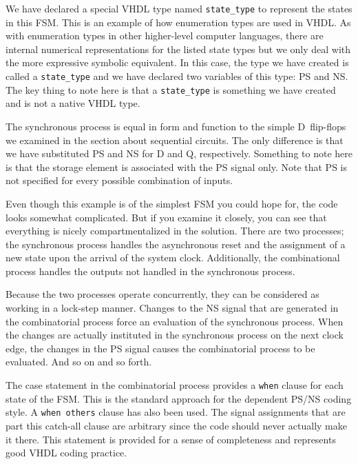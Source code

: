 \begin{my_list}
\item We have declared a special VHDL type named \texttt{state\_type} to represent the states in this FSM. This is an example of how enumeration types are used in VHDL. As with enumeration types in other higher-level computer languages, there are internal numerical representations for the listed state types but we only deal with the more expressive symbolic equivalent. In this case, the type we have created is called a \texttt{state\_type} and we have declared two variables of this type: PS and NS. The key thing to note here is that a \texttt{state\_type} is something we have created and is not a native VHDL type.

\item The synchronous process is equal in form and function to the simple D~flip-flops we examined in the section about sequential circuits. The only difference is that we have substituted PS and NS for D and Q, respectively. Something to note here is that the storage element is associated with the PS signal only. Note that PS is not specified for every possible combination of inputs. 

\item Even though this example is of the simplest FSM you could hope for, the code looks somewhat complicated. But if you examine it closely, you can see that everything is nicely compartmentalized in the solution. There are two processes; the synchronous process handles the asynchronous reset and the assignment of a new state upon the arrival of the system clock. Additionally, the combinational process handles the outputs not handled in the synchronous process. 

\item Because the two processes operate concurrently, they can be considered as working in a lock-step manner. Changes to the NS signal that are generated in the combinatorial process force an evaluation of the synchronous process. When the changes are actually instituted in the synchronous process on the next clock edge, the changes in the PS signal causes the combinatorial process to be evaluated. And so on and so forth. 

\item The case statement in the combinatorial process provides a \texttt{when} clause for each state of the FSM. This is the standard approach for the dependent PS/NS coding style. A \texttt{when others} clause has also been used. The signal assignments that are part this catch-all clause are arbitrary since the code should never actually make it there. This statement is provided for a sense of completeness and represents good VHDL coding practice. 


\end{my_list}
